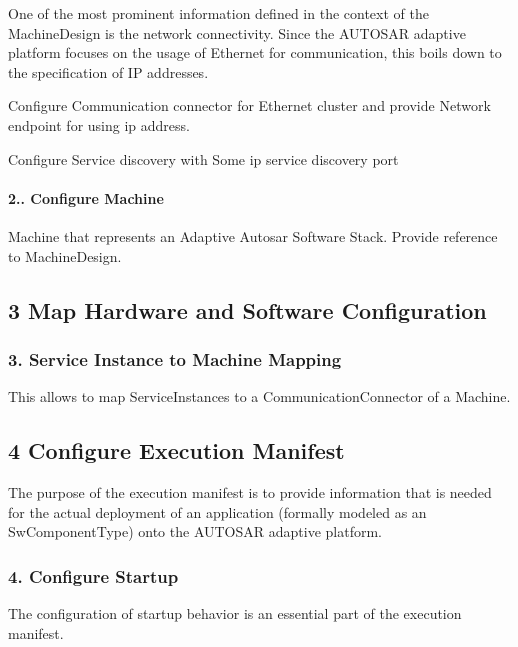 One of the most prominent information defined in the context of the Machine\+Design is the network connectivity. Since the A\+U\+T\+O\+S\+AR adaptive platform focuses on the usage of Ethernet for communication, this boils down to the specification of IP addresses.
\begin{DoxyItemize}
\item Configure Communication connector for Ethernet cluster and provide Network endpoint for using ip address.
\item Configure Service discovery with Some ip service discovery port
\end{DoxyItemize}

\paragraph*{2.. Configure Machine}

Machine that represents an Adaptive Autosar Software Stack. Provide reference to Machine\+Design.



\subsection*{3 Map Hardware and Software Configuration}

\subsubsection*{3. Service Instance to Machine Mapping}

This allows to map Service\+Instances to a Communication\+Connector of a Machine.



\subsection*{4 Configure Execution Manifest}

The purpose of the execution manifest is to provide information that is needed for the actual deployment of an application (formally modeled as an Sw\+Component\+Type) onto the A\+U\+T\+O\+S\+AR adaptive platform. 

\subsubsection*{4. Configure Startup}

The configuration of startup behavior is an essential part of the execution manifest.

